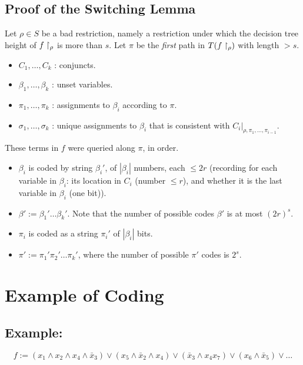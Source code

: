 \subsection{Proof of the Switching Lemma}
 
Let \( \rho \in S \) be a bad restriction, namely a restriction under which the decision tree height of $f\upharpoonright_\rho$ is more than $s$.  
Let \( \pi \) be the \emph{first} path in \( T(f\upharpoonright_{\rho}) \) with length \( > s \).

\begin{itemize}
    \item \( C_1, \dots, C_k \) : conjuncts.
    \item \( \beta_1, \dots, \beta_k \) : unset variables.
    \item \( \pi_1, \dots, \pi_k \) : assignments to \( \beta_i \) according to \( \pi \).
    \item \( \sigma_1, \dots, \sigma_k \) : unique assignments to \( \beta_i \) that is consistent with \( C_i |_{\rho, \pi_1, \dots, \pi_{i-1}} \).
\end{itemize}
These terms in \( f \) were queried along \( \pi \), in order.

\begin{itemize}
    \item \( \beta_i \) is coded by string \( \beta_i' \), of \( |\beta_i| \) numbers, each \( \leq 2r \) (recording for each variable in \( \beta_i \): its location in \( C_i \) (number \( \leq r \)), and whether it is the last variable in \( \beta_i \) (one bit)).
    \item \( \beta' := \beta_1' \dots \beta_k' \). Note that the number of possible codes $\beta'$ is at most $ (2r)^s $.
    \item \( \pi_i \) is coded as a string \( \pi_i' \) of \( |\beta_i| \) bits.
    \item \( \pi' := \pi_1' \pi_2' \dots \pi_k' \), where the number of possible \( \pi' \) codes is \( 2^s \).
\end{itemize}


\section*{Example of Coding}

\subsection*{Example:}
\[
f := (x_1 \wedge x_2 \wedge x_4 \wedge \bar{x}_3) \vee (x_5 \wedge \bar{x}_2 \wedge x_4) \vee (\bar{x}_3 \wedge x_4 x_7) \vee (x_6 \wedge \bar{x}_5) \vee \dots
\]

